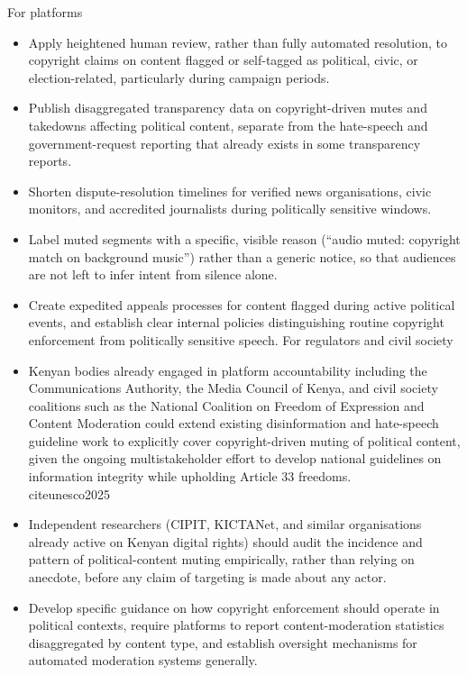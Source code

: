 \documentclass{article}
\begin{document}
For platforms
\begin{itemize}

\item Apply heightened human review, rather than fully automated resolution, to copyright claims on content flagged or self-tagged as political, civic, or election-related, particularly during campaign periods.
\item Publish disaggregated transparency data on copyright-driven mutes and takedowns affecting political content, separate from the hate-speech and government-request reporting that already exists in some transparency reports.
\item Shorten dispute-resolution timelines for verified news organisations, civic monitors, and accredited journalists during politically sensitive windows.
\item Label muted segments with a specific, visible reason (“audio muted: copyright match on background music”) rather than a generic notice, so that audiences are not left to infer intent from silence alone.
\item Create expedited appeals processes for content flagged during active political events, and establish clear internal policies distinguishing routine copyright enforcement from politically sensitive speech.
For regulators and civil society
\item Kenyan bodies already engaged in platform accountability including the Communications Authority, the Media Council of Kenya, and civil society coalitions such as the National Coalition on Freedom of Expression and Content Moderation could extend existing disinformation and hate-speech guideline work to explicitly cover copyright-driven muting of political content, given the ongoing multistakeholder effort to develop national guidelines on information integrity while upholding Article 33 freedoms. \\cite{unesco2025}
\item Independent researchers (CIPIT, KICTANet, and similar organisations already active on Kenyan digital rights) should audit the incidence and pattern of political-content muting empirically, rather than relying on anecdote, before any claim of targeting is made about any actor.
\item Develop specific guidance on how copyright enforcement should operate in political contexts, require platforms to report content-moderation statistics disaggregated by content type, and establish oversight mechanisms for automated moderation systems generally.
\end{itemize}
\end{document}

